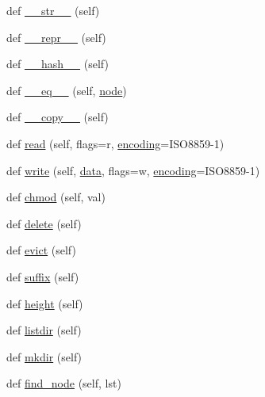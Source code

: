 \begin{DoxyCompactItemize}
def \hyperlink{classwaflib_1_1_node_1_1_node_aea11f410459c73450de99bd614222100}{\+\_\+\+\_\+str\+\_\+\+\_\+} (self)
\item 
def \hyperlink{classwaflib_1_1_node_1_1_node_a312e0f3ae404d593e43dc8afd8965de9}{\+\_\+\+\_\+repr\+\_\+\+\_\+} (self)
\item 
def \hyperlink{classwaflib_1_1_node_1_1_node_ad2272ed88f10bb1e6e2f473ec38fa5a4}{\+\_\+\+\_\+hash\+\_\+\+\_\+} (self)
\item 
def \hyperlink{classwaflib_1_1_node_1_1_node_a2fce3a217e2e7ef6192cb2e5e0671a4c}{\+\_\+\+\_\+eq\+\_\+\+\_\+} (self, \hyperlink{structnode}{node})
\item 
def \hyperlink{classwaflib_1_1_node_1_1_node_ac6b216662a82357074bf7508a313ac06}{\+\_\+\+\_\+copy\+\_\+\+\_\+} (self)
\item 
def \hyperlink{classwaflib_1_1_node_1_1_node_a05c37e221931a32e74bd11e2dbb38431}{read} (self, flags=\textquotesingle{}r\textquotesingle{}, \hyperlink{structencoding}{encoding}=\textquotesingle{}I\+S\+O8859-\/1\textquotesingle{})
\item 
def \hyperlink{classwaflib_1_1_node_1_1_node_a3e2f255b6614d98ff3f73903cc1a0439}{write} (self, \hyperlink{lib_2expat_8h_ac39e72a1de1cb50dbdc54b08d0432a24}{data}, flags=\textquotesingle{}w\textquotesingle{}, \hyperlink{structencoding}{encoding}=\textquotesingle{}I\+S\+O8859-\/1\textquotesingle{})
\item 
def \hyperlink{classwaflib_1_1_node_1_1_node_a7c69c9ee890bc2113f4f44c8b6d0aed5}{chmod} (self, val)
\item 
def \hyperlink{classwaflib_1_1_node_1_1_node_a5b15f6a29b5158a010fc78e7d2a4eef8}{delete} (self)
\item 
def \hyperlink{classwaflib_1_1_node_1_1_node_a31ebb3fd3aee8086605111ce83122453}{evict} (self)
\item 
def \hyperlink{classwaflib_1_1_node_1_1_node_a08a86be308b4ea7e209571274504852a}{suffix} (self)
\item 
def \hyperlink{classwaflib_1_1_node_1_1_node_a6f41a0f58447b1e67c4e4826e718f853}{height} (self)
\item 
def \hyperlink{classwaflib_1_1_node_1_1_node_a70c5530ee0dc91ddd80178d039c04d94}{listdir} (self)
\item 
def \hyperlink{classwaflib_1_1_node_1_1_node_a93340e13646660f3835b0c11e133bb64}{mkdir} (self)
\item 
def \hyperlink{classwaflib_1_1_node_1_1_node_a9ab508cb5f7d7069e8575d4d660c8379}{find\+\_\+node} (self, lst)
\item 

\end{DoxyCompactItemize}
